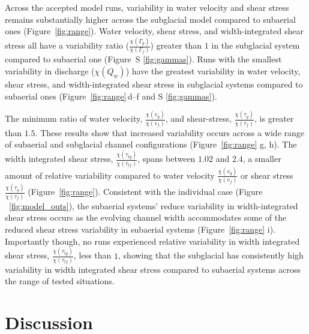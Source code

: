 \documentclass[draft]{agujournal2019}
\begin{document}
  Across the accepted model runs, variability in water velocity and shear stress remains substantially higher across the subglacial model compared to subaerial ones (Figure~\ref{fig:range}).
  Water velocity, shear stress, and width-integrated shear stress all have a variability ratio ($\frac{\chi(\Gamma_{g})}{\chi(\Gamma_f)}$) greater than $1$ in the subglacial  system compared to subaerial one (Figure~S \ref{fig:gammas}).
  Runs with the smallest variability in discharge ($\chi(Q_w)$) have the greatest variability in water velocity, shear stress, and width-integrated shear stress in subglacial systems compared to subaerial ones (Figure~\ref{fig:range}\,d--f and S \ref{fig:gammas}).
  
  The minimum ratio of  water velocity, $\frac{\chi(v_{g})}{\chi(v_{f})}$, and shear-stress, $\frac{\chi(\tau_{g})}{\chi(\tau_{f})}$, is greater than $1.5$.
  These results show that increased variability occurs across a wide range of subaerial and subglacial channel configurations (Figure~\ref{fig:range} g, h).
The width integrated shear stress, $\frac{\chi(\tau_{tg})}{\chi( \tau_{tf})}$, spans between $1.02$ and $2.4$, a smaller amount of relative variability compared to  water velocity $\frac{\chi(v_{g})}{\chi(v_{f})}$ or shear stress $\frac{\chi(\tau_{g})}{\chi(\tau_{f})}$ (Figure~\ref{fig:range}).
Consistent with the individual case (Figure ~\ref{fig:model_outs}), the subaerial systems' reduce variability in width-integrated shear stress occurs  as the evolving channel width accommodates some of the reduced shear stress variability in subaerial systems (Figure~\ref{fig:range} i).
  Importantly though, no runs experienced relative variability in width integrated shear stress, $\frac{\chi(\tau_{tg})}{\chi( \tau_{tf})}$, less than $1$, showing that the subglacial has consistently high variability in width integrated shear stress compared to subaerial systems across the range of tested situations.

  \section{Discussion}
\end{document}
